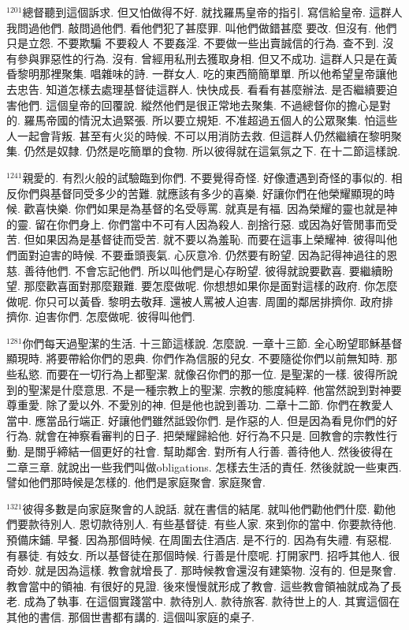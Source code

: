 \documentclass{book}
\begin{document}
$^{1201}$總督聽到這個訴求.
但又怕做得不好.
就找羅馬皇帝的指引.
寫信給皇帝.
這群人我問過他們.
敲問過他們.
看他們犯了甚麼罪.
叫他們做錯甚麼 要改.
但沒有.
他們只是立怨.
不要欺騙 不要殺人 不要姦淫.
不要做一些出賣誠信的行為.
查不到.
沒有參與罪惡性的行為.
沒有.
曾經用私刑去獲取身相.
但又不成功.
這群人只是在黃昏黎明那裡聚集.
唱雜味的詩.
一群女人.
吃的東西簡簡單單.
所以他希望皇帝讓他去忠告.
知道怎樣去處理基督徒這群人.
快快成長.
看看有甚麼辦法.
是否繼續要迫害他們.
這個皇帝的回覆說.
縱然他們是很正常地去聚集.
不過總督你的擔心是對的.
羅馬帝國的情況太過緊張.
所以要立規矩.
不准超過五個人的公眾聚集.
怕這些人一起會背叛.
甚至有火災的時候.
不可以用消防去救.
但這群人仍然繼續在黎明聚集.
仍然是奴隸.
仍然是吃簡單的食物.
所以彼得就在這氣氛之下.
在十二節這樣說.

$^{1241}$親愛的.
有烈火般的試驗臨到你們.
不要覺得奇怪.
好像遭遇到奇怪的事似的.
相反你們與基督同受多少的苦難.
就應該有多少的喜樂.
好讓你們在他榮耀顯現的時候.
歡喜快樂.
你們如果是為基督的名受辱罵.
就真是有福.
因為榮耀的靈也就是神的靈.
留在你們身上.
你們當中不可有人因為殺人.
剖捨行惡.
或因為好管閒事而受苦.
但如果因為是基督徒而受苦.
就不要以為羞恥.
而要在這事上榮耀神.
彼得叫他們面對迫害的時候.
不要垂頭喪氣.
心灰意冷.
仍然要有盼望.
因為記得神過往的恩慈.
善待他們.
不會忘記他們.
所以叫他們是心存盼望.
彼得就說要歡喜.
要繼續盼望.
那麼歡喜面對那麼艱難.
要怎麼做呢.
你想想如果你是面對這樣的政府.
你怎麼做呢.
你只可以黃昏.
黎明去敬拜.
還被人罵被人迫害.
周圍的鄰居排擠你.
政府排擠你.
迫害你們.
怎麼做呢.
彼得叫他們.

$^{1281}$你們每天過聖潔的生活.
十三節這樣說.
怎麼說.
一章十三節.
全心盼望耶穌基督顯現時.
將要帶給你們的恩典.
你們作為信服的兒女.
不要隨從你們以前無知時.
那些私慾.
而要在一切行為上都聖潔.
就像召你們的那一位.
是聖潔的一樣.
彼得所說到的聖潔是什麼意思.
不是一種宗教上的聖潔.
宗教的態度純粹.
他當然說到對神要尊重愛.
除了愛以外.
不愛別的神.
但是他也說到善功.
二章十二節.
你們在教愛人當中.
應當品行端正.
好讓他們雖然詆毀你們.
是作惡的人.
但是因為看見你們的好行為.
就會在神察看審判的日子.
把榮耀歸給他.
好行為不只是.
回教會的宗教性行動.
是關乎締結一個更好的社會.
幫助鄰舍.
對所有人行善.
善待他人.
然後彼得在二章三章.
就說出一些我們叫做obligations.
怎樣去生活的責任.
然後就說一些東西.
譬如他們那時候是怎樣的.
他們是家庭聚會.
家庭聚會.

$^{1321}$彼得多數是向家庭聚會的人說話.
就在書信的結尾.
就叫他們勸他們什麼.
勸他們要款待別人.
恩切款待別人.
有些基督徒.
有些人家.
來到你的當中.
你要款待他.
預備床鋪.
早餐.
因為那個時候.
在周圍去住酒店.
是不行的.
因為有失禮.
有惡棍.
有暴徒.
有妓女.
所以基督徒在那個時候.
行善是什麼呢.
打開家門.
招呼其他人.
很奇妙.
就是因為這樣.
教會就增長了.
那時候教會還沒有建築物.
沒有的.
但是聚會.
教會當中的領袖.
有很好的見證.
後來慢慢就形成了教會.
這些教會領袖就成為了長老.
成為了執事.
在這個實踐當中.
款待別人.
款待旅客.
款待世上的人.
其實這個在其他的書信.
那個世書都有講的.
這個叫家庭的桌子.
\end{document}

